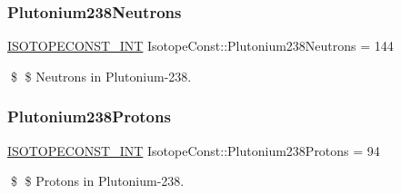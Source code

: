 \subsubsection{\texorpdfstring{Plutonium238\+Neutrons}{Plutonium238Neutrons}}
{\footnotesize\ttfamily \mbox{\hyperlink{group___isotope_const-_macros_ga5f18360b3e99483a35c32d789e62621c}{I\+S\+O\+T\+O\+P\+E\+C\+O\+N\+S\+T\+\_\+\+I\+NT}} Isotope\+Const\+::\+Plutonium238\+Neutrons = 144}

\$ \$ Neutrons in Plutonium-\/238. \mbox{\label{group___isotope_const-_plutonium-_pu238_ga06787b67eff80f1c4405031f0c8464d9}} 
\subsubsection{\texorpdfstring{Plutonium238\+Protons}{Plutonium238Protons}}
{\footnotesize\ttfamily \mbox{\hyperlink{group___isotope_const-_macros_ga5f18360b3e99483a35c32d789e62621c}{I\+S\+O\+T\+O\+P\+E\+C\+O\+N\+S\+T\+\_\+\+I\+NT}} Isotope\+Const\+::\+Plutonium238\+Protons = 94}

\$ \$ Protons in Plutonium-\/238. 